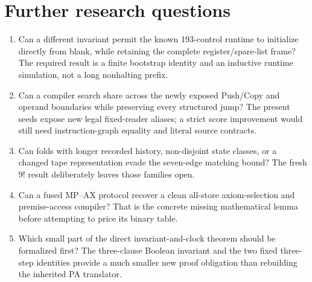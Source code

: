 \documentclass[11pt]{article}
\begin{document}
\section{Further research questions}
\begin{enumerate}
\item Can a different invariant permit the known 193-control runtime to initialize directly from blank, while retaining the complete register/spare-list frame? The required result is a finite bootstrap identity and an inductive runtime simulation, not a long nonhalting prefix.
\item Can a compiler search share across the newly exposed Push/Copy and operand boundaries while preserving every structured jump? The present seeds expose new legal fixed-reader aliases; a strict score improvement would still need instruction-graph equality and literal source contracts.
\item Can folds with longer recorded history, non-disjoint state classes, or a changed tape representation evade the seven-edge matching bound? The fresh $9!$ result deliberately leaves those families open.
\item Can a fused MP--AX protocol recover a clean all-store axiom-selection and premise-access compiler? That is the concrete missing mathematical lemma before attempting to price its binary table.
\item Which small part of the direct invariant-and-clock theorem should be formalized first? The three-clause Boolean invariant and the two fixed three-step identities provide a much smaller new proof obligation than rebuilding the inherited PA translator.
\end{enumerate}
\end{document}
